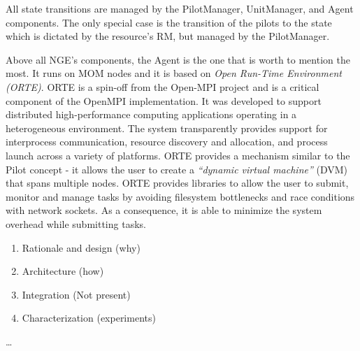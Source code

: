 All state transitions are managed by the PilotManager, UnitManager, and Agent components. The only
special case is the transition of the pilots to the state  which
is dictated by the resource's RM, but managed by the PilotManager.

Above all NGE's components, the Agent is the one that is worth to mention the most. It runs on MOM nodes and it is based on \emph{Open Run-Time Environment (ORTE)}. ORTE is a spin-off from the Open-MPI project and is a critical component of the OpenMPI implementation. It was developed to support distributed high-performance computing applications operating in a heterogeneous environment. The system transparently provides support for interprocess communication, resource discovery and allocation, and process launch across a variety of platforms. ORTE provides a mechanism similar to the Pilot concept - it allows the user to create a \emph{“dynamic virtual machine”} (DVM) that spans multiple nodes. ORTE provides libraries to allow the user to submit, monitor and manage tasks by avoiding filesystem bottlenecks and race conditions with network sockets. As a consequence, it is able to minimize the system overhead while submitting tasks.  

%




\begin{enumerate}
    \item Rationale and design (why)
    \item Architecture (how)
    \item Integration (Not present)
    \item Characterization (experiments)
\end{enumerate}

 \ldots
